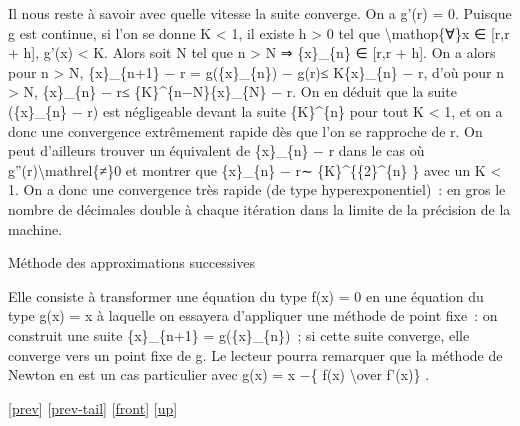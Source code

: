 \documentclass[]{article}
\begin{document}
Il nous reste à savoir avec quelle vitesse la suite converge. On a g'(r)
= 0. Puisque g est continue, si l'on se donne K \textless{} 1, il existe
h \textgreater{} 0 tel que \textbackslash{}mathop\{∀\}x ∈ {[}r,r + h{]},
\textbar{}g'(x)\textbar{} \textless{} K. Alors soit N tel que n
\textgreater{} N ⇒ \{x\}\_\{n\} ∈ {[}r,r + h{]}. On a alors pour n
\textgreater{} N, \textbar{}\{x\}\_\{n+1\} − r\textbar{} =
\textbar{}g(\{x\}\_\{n\}) − g(r)\textbar{}≤ K\textbar{}\{x\}\_\{n\} −
r\textbar{}, d'où pour n \textgreater{} N, \textbar{}\{x\}\_\{n\} −
r\textbar{}≤ \{K\}\^{}\{n−N\}\textbar{}\{x\}\_\{N\} − r\textbar{}. On en
déduit que la suite (\{x\}\_\{n\} − r) est négligeable devant la suite
\{K\}\^{}\{n\} pour tout K \textless{} 1, et on a donc une convergence
extrêmement rapide dès que l'on se rapproche de r. On peut d'ailleurs
trouver un équivalent de \textbar{}\{x\}\_\{n\} − r\textbar{} dans le
cas où g''(r)\textbackslash{}mathrel\{≠\}0 et montrer que
\textbar{}\{x\}\_\{n\} − r\textbar{}∼ \{K\}\^{}\{\{2\}\^{}\{n\} \} avec
un K \textless{} 1. On a donc une convergence très rapide (de type
hyperexponentiel)~: en gros le nombre de décimales double à chaque
itération dans la limite de la précision de la machine.

Méthode des approximations successives

Elle consiste à transformer une équation du type f(x) = 0 en une
équation du type g(x) = x à laquelle on essayera d'appliquer une méthode
de point fixe~: on construit une suite \{x\}\_\{n+1\} =
g(\{x\}\_\{n\})~; si cette suite converge, elle converge vers un point
fixe de g. Le lecteur pourra remarquer que la méthode de Newton en est
un cas particulier avec g(x) = x −\{ f(x) \textbackslash{}over f'(x)\} .

{[}\href{coursse48.html}{prev}{]}
{[}\href{coursse48.html\#tailcoursse48.html}{prev-tail}{]}
{[}\href{coursse49.html}{front}{]}
{[}\href{coursch9.html\#coursse49.html}{up}{]}
\end{document}
